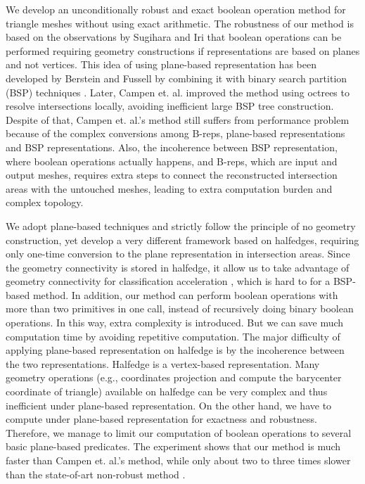 \documentclass[10pt,journal,compsoc]{IEEEtran}
\begin{document}
We develop an unconditionally robust and exact boolean operation method for triangle meshes without using exact arithmetic. The robustness of our method is based on the observations by Sugihara and Iri \cite{sugihara1990solid} that boolean operations can be performed requiring geometry constructions if representations are based on planes and not vertices. This idea of using plane-based representation has been developed by Berstein and Fussell \cite{bernstein2009fast} by combining it with binary search partition (BSP) techniques \cite{naylor1990merging,thibault1987set}. Later, Campen et. al. \cite{campen2010exact} improved the method using octrees to resolve intersections locally, avoiding inefficient large BSP tree construction. Despite of that, Campen et. al.'s method still suffers from performance problem because of the complex conversions among B-reps, plane-based representations and BSP representations. Also, the incoherence between BSP representation, where boolean operations actually happens, and B-reps, which are input and output meshes, requires extra steps to connect the reconstructed intersection areas with the untouched meshes, leading to extra computation burden and complex topology.

We adopt plane-based techniques and strictly follow the principle of no geometry construction, yet develop a very different framework based on halfedges, requiring only one-time conversion to the plane representation in intersection areas. Since the geometry connectivity is stored in halfedge, it allow us to take advantage of geometry connectivity for classification acceleration \cite{feito2013fast,ogayar2015deferred,updegrove2016boolean}, which is hard to for a BSP-based method. In addition, our method can perform boolean operations with more than two primitives in one call, instead of recursively doing binary boolean operations. In this way, extra complexity is introduced. But we can save much computation time by avoiding repetitive computation. The major difficulty of applying plane-based representation on halfedge is by the incoherence between the two representations. Halfedge is a vertex-based representation. Many geometry operations (e.g., coordinates projection and compute the barycenter coordinate of triangle) available on halfedge can be very complex and thus inefficient under plane-based representation. On the other hand, we have to compute under plane-based representation for exactness and robustness. Therefore, we manage to limit our computation of boolean operations to several basic plane-based predicates. The experiment shows that our method is much faster than Campen et. al.'s method, while only about two to three times slower than the state-of-art non-robust method \cite{douze2015quickcsg}.
\end{document}
